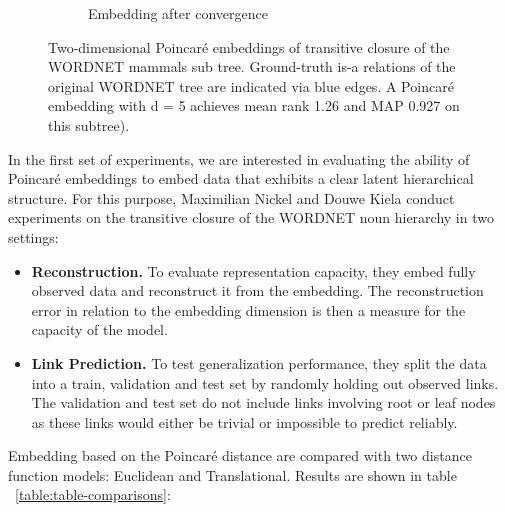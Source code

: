 \begin{figure}[htb]
\begin{center}
\begin{adjustbox}{minipage=0.5\textwidth,scale=0.5}
\begin{subfigure}[b]{\columnwidth}
            \caption{Embedding after convergence}       
            \label{fig:linguistics2}
        \end{subfigure}
    \end{adjustbox}
    \caption{Two-dimensional Poincaré embeddings of transitive closure of the WORDNET mammals sub tree. Ground-truth is-a relations of the original WORDNET tree are indicated via blue edges. A Poincaré embedding with d = 5 achieves mean rank 1.26 and MAP 0.927 on this subtree).}\label{fig:liguistics}
    
    \end{center}
\end{figure}

In the first set of experiments, we are interested in evaluating the ability of Poincaré embeddings to embed data that exhibits a clear latent hierarchical structure. For this purpose, Maximilian Nickel and Douwe Kiela \cite{NIPS2017_7213} conduct experiments on the transitive closure of the WORDNET noun hierarchy in two settings:
\begin{itemize}

    \item \textbf{Reconstruction.} To evaluate representation capacity, they embed fully observed data and reconstruct it from the embedding. The reconstruction error in relation to the embedding dimension is then a measure for the capacity of the model.
    \item \textbf{Link Prediction.} To test generalization performance, they split the data into a train, validation and test set by randomly holding out observed links. The validation and test set do not include links involving root or leaf nodes as these links would either be trivial or impossible to predict reliably.
\end{itemize}

Embedding based on the Poincaré distance are compared with two distance function models: Euclidean and Translational. Results are shown in table ~\ref{table:table-comparisons}:

